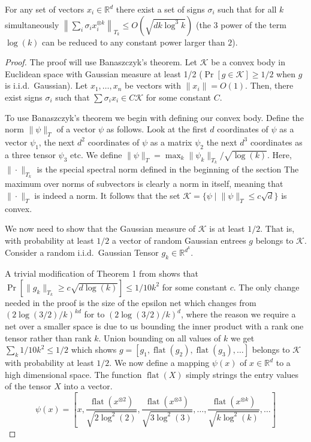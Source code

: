 \documentclass[anon,12pt]{colt2019} %
\newcommand{\R}{\mathbb{R}}
\renewcommand{\Pr}{\operatorname{Pr}}
\begin{document}
\begin{lemma}\label{uc}
For any set of vectors $x_i \in \R^d$ there exist a set of signs $\sigma_i$ such that for all $k$ simultaneously $\left\| \sum_i \sigma_i x_i^{\otimes k} \right\|_{T_k} \le O(\sqrt{d k\log^{3}{k}})$ (the $3$ power of the term $\log(k)$ can be reduced to any constant power larger than $2$). 
\end{lemma}
\begin{proof}
The proof will use Banaszczyk's theorem. 
Let $\mathcal K$ be a convex body in Euclidean space with Gaussian measure at least 1/2 ($\Pr[g \in \mathcal K] \ge 1/2$ when $g$ is i.i.d.\ Gaussian).
Let $x_1,\ldots,x_n$ be vectors with $\|x_i\| =O(1)$. 
Then, there exist signs $\sigma_i$ such that $\sum \sigma_i x_i \in C \mathcal K$ for some constant $C$.


To use Banaszczyk's theorem we begin with defining our convex body.
Define the norm $\|\psi\|_T$ of a vector $\psi$ as follows. Look at the first $d$ coordinates of $\psi$ as a vector $\psi_1$, the next $d^2$ coordinates of $\psi$ as a matrix $\psi_2$ the next $d^3$ coordinates as a three tensor $\psi_3$ etc.
We define $\|\psi\|_T = \max_k \|\psi_k\|_{T_k} /\sqrt{\log(k)}$. 
Here, $\|\cdot\|_{T_k}$ is the special spectral norm defined in the beginning of the section 
The maximum over norms of subvectors is clearly a norm in itself, meaning that $\|\cdot \|_T$ is indeed a norm. It follows that  the set $\mathcal K  = \{\psi \; | \; \|\psi\|_T \le c\sqrt{d}\}$ is convex. 

We now need to show that the Gaussian measure of $\mathcal K$ is at least $1/2$. 
That is, with probability at least $1/2$ a vector of random Gaussian entrees $g$ belongs to $\mathcal K$.
Consider a random i.i.d.\ Gaussian Tensor $g_k \in \R^{d^k}$. 

A trivial modification of Theorem 1 from \cite{tomioka2014spectral} shows that $\Pr[\|g_k\|_{T_k} \ge c\sqrt{d\log(k)}] \le 1/10k^2$ for some constant $c$. The only change needed in the proof is the size of the epsilon net which changes from $(2\log(3/2)/k)^{kd}$ for \cite{tomioka2014spectral} to $(2\log(3/2)/k)^d$, where the reason we require a net over a smaller space is due to us bounding the inner product with a rank one tensor rather than rank $k$. Union bounding on all values of $k$ we get $\sum_k 1/10k^2 \le 1/2$ which shows $g = [g_1, \operatorname{flat}(g_2), \operatorname{flat}(g_3), \ldots]$ belongs to $\mathcal K$ with probability at least $1/2$. 
%
We now define a mapping $\psi(x)$ of $x\in \R^d$ to a high dimensional space. The function $\operatorname{flat}(X)$ simply strings the entry values of the tensor $X$ into a vector.
$$\psi(x) = [x, \frac{\operatorname{flat}(x^{\otimes 2})}{\sqrt{2\log^2(2)}}, \frac{\operatorname{flat}(x^{\otimes 3})}{\sqrt{3\log^2(3)}}, \ldots,\frac{\operatorname{flat}(x^{\otimes k})}{\sqrt{k\log^2(k)}},\ldots]$$


\end{proof}
\end{document}
